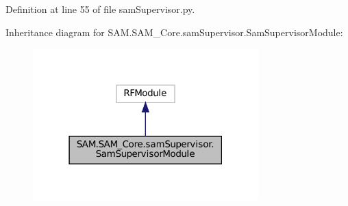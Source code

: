 Definition at line 55 of file sam\+Supervisor.\+py.



Inheritance diagram for S\+A\+M.\+S\+A\+M\+\_\+\+Core.\+sam\+Supervisor.\+Sam\+Supervisor\+Module\+:
\nopagebreak
\begin{figure}[H]
\begin{center}
\leavevmode
\includegraphics[width=247pt]{classSAM_1_1SAM__Core_1_1samSupervisor_1_1SamSupervisorModule__inherit__graph}
\end{center}
\end{figure}

